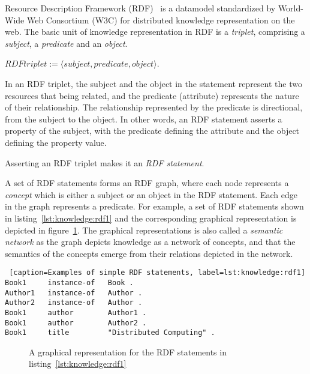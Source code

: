 Resource Description Framework (RDF)~\citep{Decker:2000} is a datamodel standardized by World-Wide Web Consortium (W3C) for 
distributed knowledge representation on the web. The basic unit of knowledge representation in RDF is a {\em triplet}, comprising 
a {\em subject}, a {\em predicate} and an {\em object}.

\begin{definition} 
  		$RDF triplet := \langle subject, predicate, object \rangle$. 
\end{definition}

\noindent
In an RDF triplet, the subject and the object in the statement represent the two resources that being related, and the 
predicate (attribute) represents the nature of their relationship. The relationship represented by the predicate is 
directional, from the subject to the object. In other words, an RDF statement asserts a property of the subject, with
the predicate defining the attribute and the object defining the property value.

\begin{definition} 
	Asserting an RDF triplet makes it an {\em RDF statement}.
\end{definition}

\noindent
A set of RDF statements forms an RDF graph, where each node represents a {\em concept} which is either a subject or an object
in the RDF statement. Each edge in the graph represents a predicate. For example, a set of RDF statements shown in 
listing~\ref{lst:knowledge:rdf1} and the corresponding graphical representation is depicted in figure~\ref{fig:knowledge:rdf1}. 
The graphical representations is also called a {\em semantic network} as the graph depicts knowledge as a network of concepts,
and that the semantics of the concepts emerge from their relations depicted in the network.
 
\begin{lstlisting} [caption=Examples of simple RDF statements, label=lst:knowledge:rdf1]
Book1     instance-of   Book .
Author1   instance-of   Author .
Author2   instance-of   Author .
Book1     author        Author1 .
Book1     author        Author2 .
Book1     title         "Distributed Computing" .
\end{lstlisting}

\begin{figure}[!htbp]
	\centerline{
	}
	\caption{A graphical representation for the RDF statements in listing~\ref{lst:knowledge:rdf1}}
	\label{fig:knowledge:rdf1}
\end{figure}

